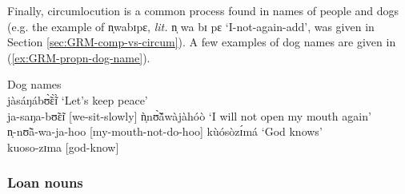 \begin{exe}
\begin{exe}
\begin{exe}
\begin{exe}
\begin{exe}
\begin{exe}
\begin{exe}
\begin{exe}
Finally, circumlocution is a common process found in names of people and dogs (e.g. the example of {\sls n̩wabɪpɛ}, {\it lit.}  {\sls n̩ wa bɪ pɛ}  `I-not-again-add', was given in Section \ref{sec:GRM-comp-vs-circum}).   A few examples of dog names are given in (\ref{ex:GRM-propn-dog-name}).

  \ea\label{ex:GRM-propn-dog-name}{\rm Dog names}\\

 \ea\label{ex:GRM-propn-dog-name-1} 
{\sls jàsáŋábʊ̃̀ɛ̃̀ɪ̀} {\rm  `Let's keep peace'}\\
ja-saŋa-bʊ̃ɛ̃ɪ    {\rm [we-sit-slowly]} 
 \ex\label{ex:GRM-propn-dog-name-2} 
{\sls ǹ̩nʊ̃̀ã́wàjàhóò}  {\rm  `I will not open my mouth again'}\\
 n̩-nʊ̃ã-wa-ja-hoo   {\rm [my-mouth-not-do-hoo]}
 \ex\label{ex:GRM-propn-dog-name-3} 
{\sls kùósòzɪ́má}   {\rm `God knows'}\\
kuoso-zɪma  {\rm  [god-know]}

\z 
 \z



\subsubsection{Loan nouns}
\label{sec:GRM-borr-noun}


\end{exe}
\end{exe}
\end{exe}
\end{exe}
\end{exe}
\end{exe}
\end{exe}
\end{exe}
